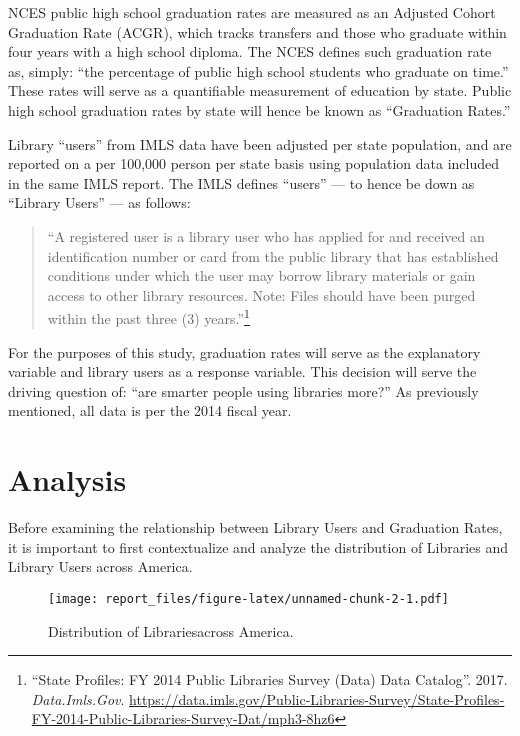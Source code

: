 \documentclass[12pt,]{article}
\begin{document}
NCES public high school graduation rates are measured as an Adjusted
Cohort Graduation Rate (ACGR), which tracks transfers and those who
graduate within four years with a high school diploma. The NCES defines
such graduation rate as, simply: ``the percentage of public high school
students who graduate on time.'' These rates will serve as a
quantifiable measurement of education by state. Public high school
graduation rates by state will hence be known as ``Graduation Rates.''

Library ``users'' from IMLS data have been adjusted per state
population, and are reported on a per 100,000 person per state basis
using population data included in the same IMLS report. The IMLS defines
``users'' --- to hence be down as ``Library Users'' --- as follows:

\begin{quote}
``A registered user is a library user who has applied for and received
an identification number or card from the public library that has
established conditions under which the user may borrow library materials
or gain access to other library resources. Note: Files should have been
purged within the past three (3) years.''\footnote{``State Profiles: FY
  2014 Public Libraries Survey (Data) \textbar{} Data Catalog''. 2017.
  \emph{Data.Imls.Gov}.
  \url{https://data.imls.gov/Public-Libraries-Survey/State-Profiles-FY-2014-Public-Libraries-Survey-Dat/mph3-8hz6}}
\end{quote}

For the purposes of this study, graduation rates will serve as the
explanatory variable and library users as a response variable. This
decision will serve the driving question of: ``are smarter people using
libraries more?'' As previously mentioned, all data is per the 2014
fiscal year.

\newpage

\section{Analysis}\label{analysis}

Before examining the relationship between Library Users and Graduation
Rates, it is important to first contextualize and analyze the
distribution of Libraries and Library Users across America.
\vspace{20pt}

\begin{figure}[htbp]
\centering
\texttt{[image: report\_files/figure-latex/unnamed-chunk-2-1.pdf]}
\caption{Distribution of Librariesacross America.}
\end{figure}
\end{document}

